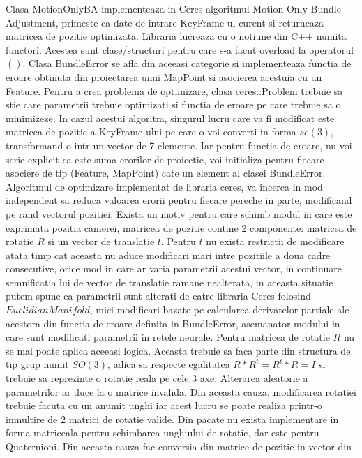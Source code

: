 \documentclass[12pt,a4paper]{report}
\begin{document}
Clasa MotionOnlyBA implementeaza in Ceres algoritmul Motion Only Bundle Adjustment,
primeste ca date de intrare KeyFrame-ul curent si returneaza matricea de pozitie optimizata.
Libraria lucreaza cu o notiune din C++ numita functori. Acestea sunt clase/structuri pentru
care s-a facut overload la operatorul $ () $. Clasa BundleError se afla din aceeasi categorie
si implementeaza functia de eroare obtinuta din proiectarea unui MapPoint si asocierea 
acestuia cu un Feature. Pentru a crea problema de optimizare, clasa ceres::Problem trebuie 
sa stie care parametrii trebuie optimizati si functia de eroare pe care trebuie sa o minimizeze.
In cazul acestui algoritm, singurul lucru care va fi modificat este matricea de pozitie a KeyFrame-ului
pe care o voi converti in forma $ se(3) $, transformand-o intr-un vector de 7 elemente. Iar pentru 
functia de eroare, nu voi scrie explicit ca este suma erorilor de proiectie, voi initializa pentru
fiecare asociere de tip (Feature, MapPoint) cate un element al clasei BundleError. Algoritmul de 
optimizare implementat de libraria ceres, va incerca in mod independent sa reduca valoarea erorii 
pentru fiecare pereche in parte, modificand pe rand vectorul pozitiei. Exista un motiv pentru 
care schimb modul in care este exprimata pozitia camerei, matricea de pozitie contine 2 componente:
matricea de rotatie $ R $ si un vector de translatie $ t $. Pentru $ t $ nu exista restrictii 
de modificare atata timp cat aceasta nu aduce modificari mari intre pozitiile a doua cadre consecutive,
orice mod in care ar varia parametrii acestui vector, in continuare semnificatia
lui de vector de translatie ramane nealterata, in aceasta situatie putem spune ca parametrii 
sunt alterati de catre libraria Ceres folosind $ EuclidianManifold $, mici modificari bazate pe
calcularea derivatelor partiale ale acestora din functia de eroare definita in BundleError, asemanator 
modului in care sunt modificati parametrii in retele neurale. Pentru matricea de rotatie $ R $ nu se 
mai poate aplica aceeasi logica. Aceasta trebuie sa faca parte din structura de tip grup numit 
$ SO(3) $, adica sa respecte egalitatea $ R * R^t = R^t * R = I $ si trebuie sa reprezinte o rotatie 
reala pe cele 3 axe. Alterarea aleatorie a parametrilor ar duce la o matrice invalida. Din aceasta
cauza, modificarea rotatiei trebuie facuta cu un anumit unghi
iar acest lucru se poate realiza printr-o inmultire de 2 matrici de rotatie valide. Din pacate nu 
exista implementare in forma matriceala pentru schimbarea unghiului de rotatie, dar este pentru
Quaternioni. Din aceasta cauza fac conversia din matrice de pozitie in vector din 
\end{document}

